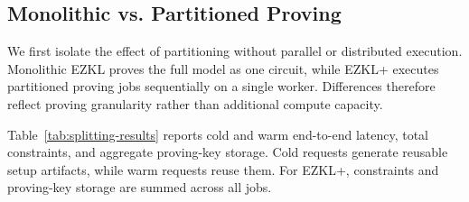 



\subsection{Monolithic vs. Partitioned Proving}
\label{sec:eval-monolithic-vs-partitioned}

We first isolate the effect of partitioning without parallel or distributed execution. Monolithic EZKL proves the full model as one circuit, while EZKL+\TITLE{} executes partitioned proving jobs sequentially on a single worker. Differences therefore reflect proving granularity rather than additional compute capacity.

Table~\ref{tab:splitting-results} reports cold and warm end-to-end latency, total constraints, and aggregate proving-key storage. Cold requests generate reusable setup artifacts, while warm requests reuse them. For EZKL+\TITLE{}, constraints and proving-key storage are summed across all jobs.

